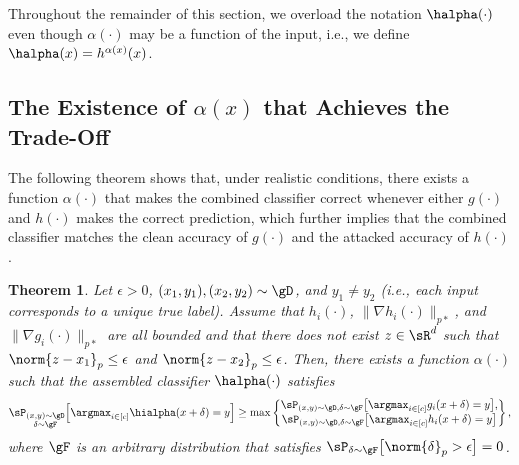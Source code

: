\documentclass[11pt, letterpaper]{article}
\theoremstyle{plain}
\newtheorem{theorem}{Theorem}
\theoremstyle{definition}
\begin{document}
Throughout the remainder of this section, we overload the notation $\halpha (\cdot)$ even though $\alpha (\cdot)$ may be a function of the input, i.e., we define $\halpha (x) = h^{\alpha (x)}(x)$.


\subsection{The Existence of $\alpha (x)$ that Achieves the Trade-Off} \label{sec:alpha(x)}

The following theorem shows that, under realistic conditions, there exists a function $\alpha (\cdot)$ that makes the combined classifier correct whenever either $g (\cdot)$ and $h (\cdot)$ makes the correct prediction, which further implies that the combined classifier matches the clean accuracy of $g (\cdot)$ and the attacked accuracy of $h (\cdot)$.

\begin{theorem} \label{THM:ADA}
    Let $\epsilon> 0$, $(x_1,y_1),(x_2,y_2)\sim \gD$, and $y_1\ne y_2$ (i.e., each input corresponds to a unique true label). Assume that $h_i(\cdot)$, $\|\nabla h_i(\cdot)\|_{p*}$, and $\|\nabla g_i(\cdot)\|_{p*}$ are all bounded and that there does not exist $z \in \sR^d$ such that $\norm{z - x_1}_p \leq \epsilon$ and $\norm{z - x_2}_p \leq \epsilon$. Then, there exists a function $\alpha (\cdot)$ such that the assembled classifier $\halpha (\cdot)$ satisfies
    \begin{align*}
        \sP_{\substack{(x, y) \sim \gD \\ \delta \sim \gF}} \Big[ \argmax_{i \in [c]} \hialpha (x+\delta) = y \Big] 
        \geq \max \begin{Bmatrix}
            \sP_{(x, y) \sim \gD, \delta \sim \gF} \big[ \argmax_{i \in [c]} g_i (x+\delta) = y \big], \\
            \sP_{(x, y) \sim \gD, \delta \sim \gF} \big[ \argmax_{i \in [c]} h_i (x+\delta) = y \big]
        \end{Bmatrix},
    \end{align*}
    where $\gF$ is an arbitrary distribution that satisfies $\sP_{\delta \sim \gF} \big[ \norm{\delta}_p > \epsilon \big] = 0$.
\end{theorem}
\end{document}
